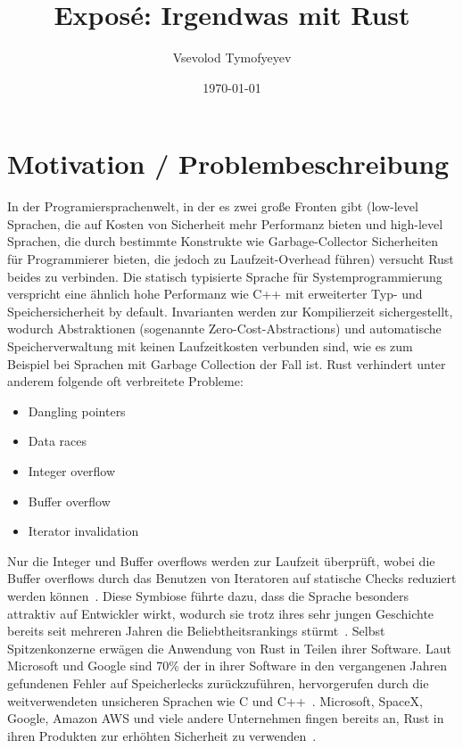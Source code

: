 \documentclass{article}
\newcounter{myWeekNum}
\newcommand{\myWeek}{\themyWeekNum
    \stepcounter{myWeekNum}
    \ifnum\themyWeekNum=53
         \setcounter{myWeekNum}{1}
    \else\fi
}
\begin{document}
\setcounter{myWeekNum}{25}
\ganttset{%
calendar week text={\myWeek{}}%
}


\title{Exposé: Irgendwas mit Rust}
\author{Vsevolod Tymofyeyev}
\date{\today}
\maketitle

\section{Motivation / Problembeschreibung}

In der Programiersprachenwelt, in der es zwei große Fronten gibt (low-level Sprachen, die auf Kosten von Sicherheit mehr Performanz bieten und high-level Sprachen, die durch bestimmte Konstrukte wie Garbage-Collector Sicherheiten für Programmierer bieten, die jedoch zu Laufzeit-Overhead führen) versucht Rust beides zu verbinden. Die statisch typisierte Sprache für Systemprogrammierung verspricht eine ähnlich hohe Performanz wie C++ mit erweiterter Typ- und Speichersicherheit by default. Invarianten werden zur Kompilierzeit sichergestellt, wodurch Abstraktionen (sogenannte Zero-Cost-Abstractions) und automatische Speicherverwaltung mit keinen Laufzeitkosten verbunden sind, wie es zum Beispiel bei Sprachen mit Garbage Collection der Fall ist. Rust verhindert unter anderem folgende oft verbreitete Probleme: 
\begin{itemize}
    \item Dangling pointers
    \item Data races
    \item Integer overflow
    \item Buffer overflow
    \item Iterator invalidation
\end{itemize}
Nur die Integer und  Buffer overflows werden zur Laufzeit überprüft, wobei die Buffer overflows durch das Benutzen von Iteratoren auf statische Checks reduziert werden können~\cite{Anderson2016}. Diese Symbiose führte dazu, dass die Sprache besonders attraktiv auf Entwickler wirkt, wodurch sie trotz ihres sehr jungen Geschichte bereits seit mehreren Jahren die Beliebtheitsrankings stürmt~\cite{StackOverflow2020}. Selbst Spitzenkonzerne erwägen die Anwendung von Rust in Teilen ihrer Software. Laut Microsoft und Google sind 70\% der in ihrer Software in den vergangenen Jahren gefundenen Fehler auf Speicherlecks zurückzuführen, hervorgerufen durch die weitverwendeten unsicheren Sprachen wie C und C++~\cite{Microsoft2019MemoryBugs, RustInAndroid}. Microsoft, SpaceX, Google, Amazon AWS und viele andere Unternehmen fingen bereits an, Rust in ihren Produkten zur erhöhten Sicherheit zu verwenden~\cite{MicrosoftJoinsRust, AmazonLovesRust, RustInAndroid, GoogleRustFoundation}.
\end{document}
